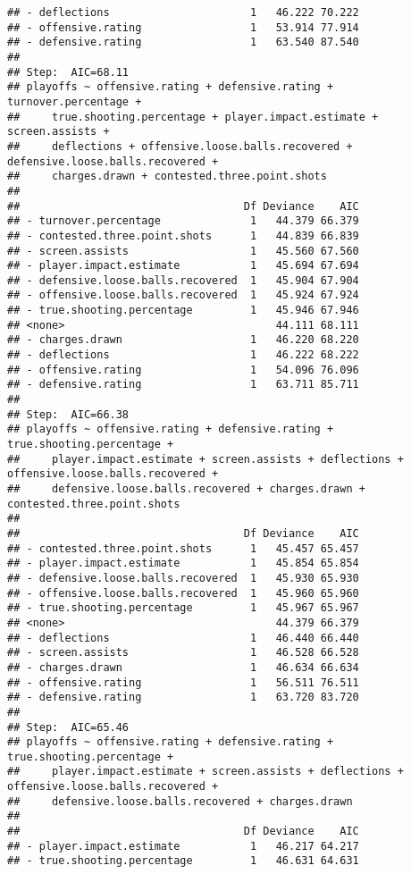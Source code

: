 \documentclass[
]{article}
\begin{document}
\begin{verbatim}
## - deflections                      1   46.222 70.222
## - offensive.rating                 1   53.914 77.914
## - defensive.rating                 1   63.540 87.540
## 
## Step:  AIC=68.11
## playoffs ~ offensive.rating + defensive.rating + turnover.percentage + 
##     true.shooting.percentage + player.impact.estimate + screen.assists + 
##     deflections + offensive.loose.balls.recovered + defensive.loose.balls.recovered + 
##     charges.drawn + contested.three.point.shots
## 
##                                   Df Deviance    AIC
## - turnover.percentage              1   44.379 66.379
## - contested.three.point.shots      1   44.839 66.839
## - screen.assists                   1   45.560 67.560
## - player.impact.estimate           1   45.694 67.694
## - defensive.loose.balls.recovered  1   45.904 67.904
## - offensive.loose.balls.recovered  1   45.924 67.924
## - true.shooting.percentage         1   45.946 67.946
## <none>                                 44.111 68.111
## - charges.drawn                    1   46.220 68.220
## - deflections                      1   46.222 68.222
## - offensive.rating                 1   54.096 76.096
## - defensive.rating                 1   63.711 85.711
## 
## Step:  AIC=66.38
## playoffs ~ offensive.rating + defensive.rating + true.shooting.percentage + 
##     player.impact.estimate + screen.assists + deflections + offensive.loose.balls.recovered + 
##     defensive.loose.balls.recovered + charges.drawn + contested.three.point.shots
## 
##                                   Df Deviance    AIC
## - contested.three.point.shots      1   45.457 65.457
## - player.impact.estimate           1   45.854 65.854
## - defensive.loose.balls.recovered  1   45.930 65.930
## - offensive.loose.balls.recovered  1   45.960 65.960
## - true.shooting.percentage         1   45.967 65.967
## <none>                                 44.379 66.379
## - deflections                      1   46.440 66.440
## - screen.assists                   1   46.528 66.528
## - charges.drawn                    1   46.634 66.634
## - offensive.rating                 1   56.511 76.511
## - defensive.rating                 1   63.720 83.720
## 
## Step:  AIC=65.46
## playoffs ~ offensive.rating + defensive.rating + true.shooting.percentage + 
##     player.impact.estimate + screen.assists + deflections + offensive.loose.balls.recovered + 
##     defensive.loose.balls.recovered + charges.drawn
## 
##                                   Df Deviance    AIC
## - player.impact.estimate           1   46.217 64.217
## - true.shooting.percentage         1   46.631 64.631

\end{verbatim}
\end{document}
